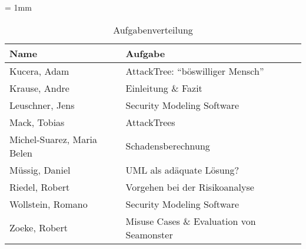 \begin{table}[H]
	\sffamily
	\caption{Aufgabenverteilung}
	\tabulinesep = 1mm %
	\centering
		\begin{tabu} to 0.9\textwidth { X[1.5]  X[3] }
		\hline
		\textbf{Name} & \textbf{Aufgabe}\\
		\hline 
		Kucera, Adam & AttackTree: "`böswilliger Mensch"'\\

		Krause, Andre & Einleitung \& Fazit\\

		Leuschner, Jens & Security Modeling Software\\

		Mack, Tobias & AttackTrees\\

		Michel-Suarez, Maria Belen & Schadensberechnung\\

		Müssig, Daniel & UML als adäquate Lösung?\\

		Riedel, Robert & Vorgehen bei der Risikoanalyse\\

		Wollstein, Romano & Security Modeling Software\\

		Zoeke, Robert & Misuse Cases \& Evaluation von Seamonster\\

	\end{tabu}
\end{table}
